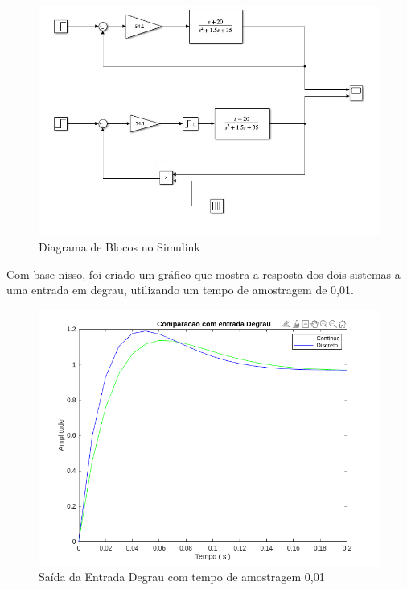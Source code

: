 \documentclass[a4paper, 12pt]{article}
\begin{document}
\begin{figure}[H]
    \centering
    \includegraphics[width=0.87\linewidth]{asss.png}
    \caption{Diagrama de Blocos no Simulink}
    \label{fig:enter-label}
\end{figure}

    Com base nisso, foi criado um gráfico que mostra a resposta dos dois sistemas a uma entrada em degrau, utilizando um tempo de amostragem de 0,01.
\begin{figure}[H]
    \centering
    \includegraphics[width=0.9\linewidth]{777.png}
    \caption{Saída da Entrada Degrau com tempo de amostragem 0,01}
    \label{fig:enter-label}
\end{figure}
\end{document}
